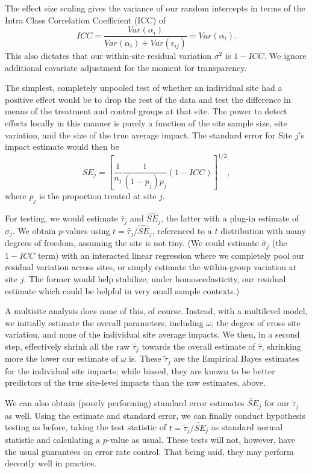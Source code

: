 \documentclass[]{article}
\begin{document}
	The effect size scaling gives the variance of our random intercepts in terms of the Intra Class Correlation Coefficient (ICC) of
	$$ ICC = \frac{Var(\alpha_i)}{Var(\alpha_i) + Var(\epsilon_{ij})} = Var(\alpha_i) .$$
	This also dictates that our within-site residual variation $\sigma^2$ is $1-ICC$.
	We ignore additional covariate adjustment for the moment for transparency.
	
	The simplest, completely unpooled test of whether an individual site had a positive effect would be to drop the rest of the data and test the difference in means of the treatment and control groups at that site.
	The power to detect effects locally in this manner is purely a function of the site sample size, site variation, and the size of the true average impact.
	The standard error for Site $j$'s impact estimate would then be
	$$ SE_j = \left[ \frac{1}{n_j} \frac{1}{(1-p_j)p_j} (1-ICC) \right]^{1/2} , $$ 
	where $p_j$ is the proportion treated at site $j$.
	
	For testing, we would estimate $\hat{\tau}_j$ and $\widehat{SE}_j$, the latter with a plug-in estimate of $\hat{\sigma}_j$.
	We obtain $p$-values using $t = \hat{\tau}_j / \widehat{SE}_j$, referenced to a $t$ distribution with many degrees of freedom, assuming the site is not tiny.
	(We could estimate $\hat{\sigma}_j$ (the $1 - ICC$ term) with an interacted linear regression where we completely pool our residual variation across sites, or simply estimate the within-group variation at site $j$. The former would help stabilize, under homoscedasticity, our residual estimate which could be helpful in very small sample contexts.)
	
	A multisite analysis does none of this, of course.
	Instead, with a multilevel model, we initially estimate the overall parameters, including $\omega$, the degree of cross site variation, and none of the individual site average impacts.
	We then, in a second step, effectively shrink all the raw $\hat{\tau}_j$ towards the overall estimate of $\hat{\tau}$, shrinking more the lower our estimate of $\omega$ is.
	These $\tilde{\tau}_j$ are the Empirical Bayes estimates for the individual site impacts; while biased, they are known to be better predictors of the true site-level impacts than the raw estimates, above.
	
	We can also obtain (poorly performing) standard error estimates $\tilde{SE}_j$ for our $\tilde{\tau}_j$ as well.
	Using the estimate and standard error, we can finally conduct hypothesis testing as before, taking the test statistic of $t = \tilde{\tau}_j / \tilde{SE}_j$ as standard normal statistic and calculating a $p$-value as usual.
	These tests will not, however, have the usual guarantees on error rate control.
	That being said, they may perform decently well in practice.
	
\end{document}
